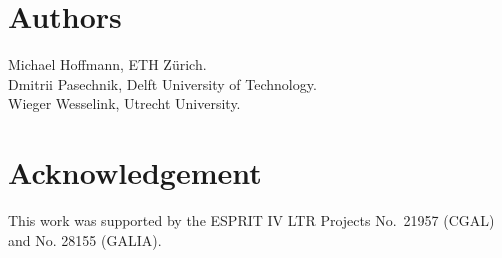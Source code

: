 
\pagestyle{plain}
\setcounter{page}{1}
\newpage


\lcTex{\vspace*{2cm}}

\section*{Authors}

Michael Hoffmann, ETH Z\"urich.\\
Dmitrii Pasechnik, Delft University of Technology.\\
Wieger Wesselink, Utrecht University.

\section*{Acknowledgement}

This work was supported by the ESPRIT IV LTR Projects No.~21957 (CGAL)
and No. 28155 (GALIA).

